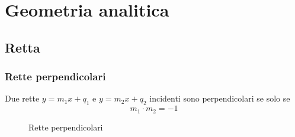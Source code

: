 \chapter{Geometria analitica}
\section{Retta}
\subsection{Rette perpendicolari}
\begin{thm}\label{thm:rette_perpendicolari}
	Due rette $y=m_1x+q_1$ e $y=m_2x+q_2$ incidenti sono perpendicolari se solo se \[m_1\cdot m_2=-1\]
\end{thm}
\begin{figure}
	\centering
	
	\caption{Rette perpendicolari}
	\label{fig:retteperp1}
\end{figure}
